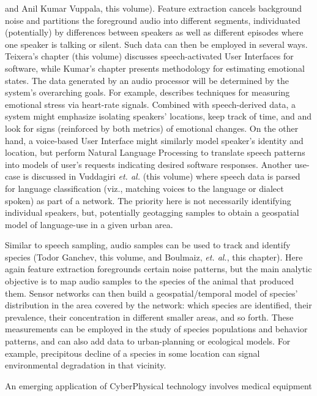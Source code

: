 {\begin{description}
and Anil Kumar Vuppala, this volume).  Feature extraction 
cancels background noise and partitions the foreground audio 
into different segments, individuated (potentially) by 
differences between speakers as well as different episodes 
where one speaker is talking or silent.  Such data can 
then be employed in several ways.  Teixera's chapter (this 
volume) discusses speech-activated User Interfaces for 
software, while Kumar's chapter presents methodology for 
estimating emotional states.  The data generated by 
an audio processor will be determined by the system's 
overarching goals.  For example, \cite{JongyoonChoi} describes 
techniques for measuring emotional stress via heart-rate signals.  
Combined with speech-derived data, a system might emphasize 
isolating speakers' locations, keep track of time, and 
and look for signs (reinforced by both metrics) of 
emotional changes.  On the other hand, a voice-based 
User Interface might similarly model speaker's identity 
and location, but perform Natural Language Processing 
to translate speech patterns into models of user's 
requests indicating desired software responses.       
Another use-case is discussed in Vuddagiri \textit{et. al.} 
(this volume) where speech data is parsed for language 
classification (viz., matching voices to the language 
or dialect spoken) as part of a  network.  
The priority here is not necessarily identifying individual 
speakers, but, potentially geotagging samples to obtain a geospatial model of 
language-use in a given urban area. 
\item[Bioacoustic Sampling]  Similar to speech sampling, 
audio samples can be used to track and identify 
species (Todor Ganchev, this volume, and Boulmaiz, \textit{et. al.}, 
this chapter).  Here again feature 
extraction foregrounds certain noise patterns, but the 
main analytic objective is to map audio samples to 
the species of the animal that produced them.  
Sensor networks can then build a geospatial/temporal 
model of species' distribution in the area covered by 
the network: which species are identified, their prevalence, 
their concentration in different smaller areas, and so forth.  
These measurements can be employed in the study of 
species populations and behavior patterns, and can 
also add data to urban-planning or ecological models.  
For example, precipitous decline of a species in some 
location can signal environmental degradation in that vicinity.   
\item[Remote Medical Diagnosis]  An emerging application of 
CyberPhysical technology involves medical equipment 

\end{description}}
